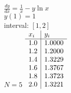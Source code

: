 {
$\displaystyle \frac{dy}{dx} = \frac{1}{x}-y\ln x$\\
$y(1)=1$\\
interval: $[1,2]$\\
$N=5$
}
{
	$\begin{array}[b]{l | l}
		x_i & y_i    \\ \hline
		1.0 & 1.0000 \\
		1.2 & 1.2000 \\
		1.4 & 1.3229 \\
		1.6 & 1.3767 \\
		1.8 & 1.3723 \\
		2.0 & 1.3221 \\
	\end{array}$
}